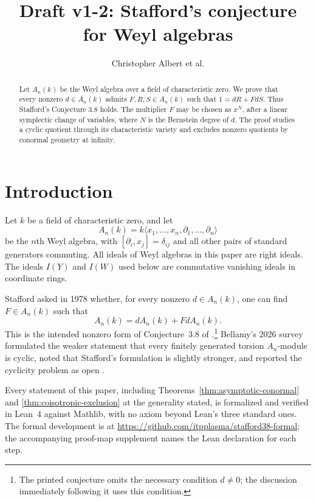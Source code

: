 \documentclass[11pt]{amsart}
\title{Draft v1-2: Stafford's conjecture for Weyl algebras}
\author{Christopher Albert et al.}
\date{}
\theoremstyle{definition}
\begin{document}
\begin{abstract}
Let $A_n(k)$ be the Weyl algebra over a field of characteristic zero.  We prove
that every nonzero $d\in A_n(k)$ admits $F,R,S\in A_n(k)$ such that
$1=dR+FdS$.  Thus Stafford's Conjecture 3.8 holds.  The multiplier $F$ may be
chosen as $x^N$, after a linear symplectic change of variables, where $N$ is
the Bernstein degree of $d$.  The proof studies a cyclic quotient through its
characteristic variety and excludes nonzero quotients by conormal geometry at
infinity.
\end{abstract}

\maketitle

\section{Introduction}

Let $k$ be a field of characteristic zero, and let
\[
 A_n(k)=k\langle x_1,\ldots,x_n,\partial_1,\ldots,\partial_n\rangle
\]
be the $n$th Weyl algebra, with
$[\partial_i,x_j]=\delta_{ij}$ and all other pairs of standard generators
commuting. All ideals of Weyl algebras in this paper are right ideals. The
ideals $I(Y)$ and $I(W)$ used below are commutative vanishing ideals in
coordinate rings.

Stafford asked in 1978 whether, for every nonzero $d\in A_n(k)$, one can find
$F\in A_n(k)$ such that
\[
 A_n(k)=dA_n(k)+FdA_n(k).
 \tag{1.1}\label{eq:stafford-ideal}
\]
This is the intended nonzero form of Conjecture~3.8 of
\cite[p.~438]{Stafford1978}.\footnote{The printed conjecture omits the
necessary condition $d\ne0$; the discussion immediately following it uses
this condition.} Bellamy's 2026 survey
formulated the weaker statement that every finitely generated torsion
$A_n$-module is cyclic, noted that Stafford's formulation is slightly
stronger, and reported the cyclicity problem as open
\cite[Section~3, Conjecture~3.4]{Bellamy2026}.

Every statement of this paper, including
Theorems~\ref{thm:asymptotic-conormal} and \ref{thm:coisotropic-exclusion}
at the generality stated, is formalized and verified in Lean~4 against
Mathlib, with no axiom beyond Lean's three standard ones. The formal
development is at \url{https://github.com/itpplasma/stafford38-formal}; the
accompanying proof-map supplement names the Lean declaration for each step.
\end{document}
